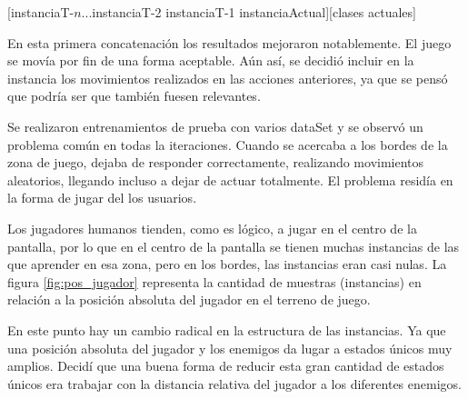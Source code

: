 [instanciaT-$n$...instanciaT-2 instanciaT-1 instanciaActual][clases actuales]

En esta primera concatenación los resultados mejoraron notablemente. El juego se movía por fin de una forma aceptable. Aún así, se decidió incluir en la instancia los movimientos realizados en las acciones anteriores, ya que se pensó que podría ser que también fuesen relevantes. 

Se realizaron entrenamientos de prueba con varios dataSet y se observó un problema común en todas la iteraciones. Cuando se acercaba a los bordes de la zona de juego, dejaba de responder correctamente, realizando movimientos aleatorios, llegando incluso a dejar de actuar totalmente. El problema residía en la forma de jugar del los usuarios.

\label{fig:pos_jugador}

Los jugadores humanos tienden, como es lógico, a jugar en el centro de la pantalla, por lo que en el centro de la pantalla se tienen muchas instancias de las que aprender en esa zona, pero en los bordes, las instancias eran casi nulas. La figura \ref{fig:pos_jugador} representa la cantidad de muestras (instancias) en relación a la posición absoluta del jugador en el terreno de juego.

En este punto hay un cambio radical en la estructura de las instancias. Ya que una posición absoluta del jugador y los enemigos da lugar a estados únicos muy amplios. Decidí que una buena forma de reducir esta gran cantidad de estados únicos era trabajar con la distancia relativa del jugador a los diferentes enemigos. 


